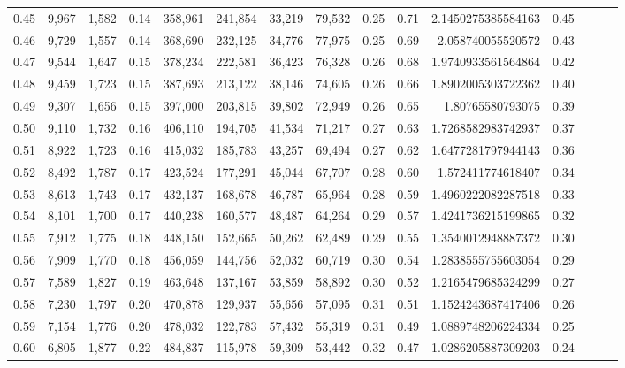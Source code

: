 \begin{tabular}{rrrrrrrrrrrrrrr}
0.45 &   9,967 &  1,582 &  0.14 &  358,961 &  241,854 &   33,219 &   79,532 &  0.25 &  0.71 &    2.1450275385584163 &      0.45 \\
0.46 &   9,729 &  1,557 &  0.14 &  368,690 &  232,125 &   34,776 &   77,975 &  0.25 &  0.69 &     2.058740055520572 &      0.43 \\
0.47 &   9,544 &  1,647 &  0.15 &  378,234 &  222,581 &   36,423 &   76,328 &  0.26 &  0.68 &    1.9740933561564864 &      0.42 \\
0.48 &   9,459 &  1,723 &  0.15 &  387,693 &  213,122 &   38,146 &   74,605 &  0.26 &  0.66 &    1.8902005303722362 &      0.40 \\
0.49 &   9,307 &  1,656 &  0.15 &  397,000 &  203,815 &   39,802 &   72,949 &  0.26 &  0.65 &      1.80765580793075 &      0.39 \\
0.50 &   9,110 &  1,732 &  0.16 &  406,110 &  194,705 &   41,534 &   71,217 &  0.27 &  0.63 &    1.7268582983742937 &      0.37 \\
0.51 &   8,922 &  1,723 &  0.16 &  415,032 &  185,783 &   43,257 &   69,494 &  0.27 &  0.62 &    1.6477281797944143 &      0.36 \\
0.52 &   8,492 &  1,787 &  0.17 &  423,524 &  177,291 &   45,044 &   67,707 &  0.28 &  0.60 &     1.572411774618407 &      0.34 \\
0.53 &   8,613 &  1,743 &  0.17 &  432,137 &  168,678 &   46,787 &   65,964 &  0.28 &  0.59 &    1.4960222082287518 &      0.33 \\
0.54 &   8,101 &  1,700 &  0.17 &  440,238 &  160,577 &   48,487 &   64,264 &  0.29 &  0.57 &    1.4241736215199865 &      0.32 \\
0.55 &   7,912 &  1,775 &  0.18 &  448,150 &  152,665 &   50,262 &   62,489 &  0.29 &  0.55 &    1.3540012948887372 &      0.30 \\
0.56 &   7,909 &  1,770 &  0.18 &  456,059 &  144,756 &   52,032 &   60,719 &  0.30 &  0.54 &    1.2838555755603054 &      0.29 \\
0.57 &   7,589 &  1,827 &  0.19 &  463,648 &  137,167 &   53,859 &   58,892 &  0.30 &  0.52 &    1.2165479685324299 &      0.27 \\
0.58 &   7,230 &  1,797 &  0.20 &  470,878 &  129,937 &   55,656 &   57,095 &  0.31 &  0.51 &    1.1524243687417406 &      0.26 \\
0.59 &   7,154 &  1,776 &  0.20 &  478,032 &  122,783 &   57,432 &   55,319 &  0.31 &  0.49 &    1.0889748206224334 &      0.25 \\
0.60 &   6,805 &  1,877 &  0.22 &  484,837 &  115,978 &   59,309 &   53,442 &  0.32 &  0.47 &    1.0286205887309203 &      0.24 \\

\end{tabular}
